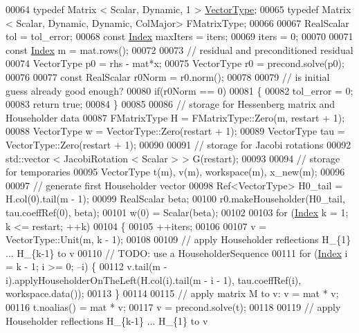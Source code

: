 \begin{DoxyCode}
00064   \textcolor{keyword}{typedef} Matrix < Scalar, Dynamic, 1 > \hyperlink{struct_vector_type}{VectorType};
00065   \textcolor{keyword}{typedef} Matrix < Scalar, Dynamic, Dynamic, ColMajor> FMatrixType;
00066 
00067   RealScalar tol = tol\_error;
00068   \textcolor{keyword}{const} \hyperlink{namespace_eigen_a62e77e0933482dafde8fe197d9a2cfde}{Index} maxIters = iters;
00069   iters = 0;
00070 
00071   \textcolor{keyword}{const} \hyperlink{namespace_eigen_a62e77e0933482dafde8fe197d9a2cfde}{Index} m = mat.rows();
00072 
00073   \textcolor{comment}{// residual and preconditioned residual}
00074   VectorType p0 = rhs - mat*x;
00075   VectorType r0 = precond.solve(p0);
00076 
00077   \textcolor{keyword}{const} RealScalar r0Norm = r0.norm();
00078 
00079   \textcolor{comment}{// is initial guess already good enough?}
00080   \textcolor{keywordflow}{if}(r0Norm == 0)
00081   \{
00082     tol\_error = 0;
00083     \textcolor{keywordflow}{return} \textcolor{keyword}{true};
00084   \}
00085 
00086   \textcolor{comment}{// storage for Hessenberg matrix and Householder data}
00087   FMatrixType H   = FMatrixType::Zero(m, restart + 1);
00088   VectorType w    = VectorType::Zero(restart + 1);
00089   VectorType tau  = VectorType::Zero(restart + 1);
00090 
00091   \textcolor{comment}{// storage for Jacobi rotations}
00092   std::vector < JacobiRotation < Scalar > > G(restart);
00093   
00094   \textcolor{comment}{// storage for temporaries}
00095   VectorType t(m), v(m), workspace(m), x\_new(m);
00096 
00097   \textcolor{comment}{// generate first Householder vector}
00098   Ref<VectorType> H0\_tail = H.col(0).tail(m - 1);
00099   RealScalar beta;
00100   r0.makeHouseholder(H0\_tail, tau.coeffRef(0), beta);
00101   w(0) = Scalar(beta);
00102   
00103   \textcolor{keywordflow}{for} (\hyperlink{namespace_eigen_a62e77e0933482dafde8fe197d9a2cfde}{Index} k = 1; k <= restart; ++k)
00104   \{
00105     ++iters;
00106 
00107     v = VectorType::Unit(m, k - 1);
00108 
00109     \textcolor{comment}{// apply Householder reflections H\_\{1\} ... H\_\{k-1\} to v}
00110     \textcolor{comment}{// TODO: use a HouseholderSequence}
00111     \textcolor{keywordflow}{for} (\hyperlink{namespace_eigen_a62e77e0933482dafde8fe197d9a2cfde}{Index} i = k - 1; i >= 0; --i) \{
00112       v.tail(m - i).applyHouseholderOnTheLeft(H.col(i).tail(m - i - 1), tau.coeffRef(i), workspace.data());
00113     \}
00114 
00115     \textcolor{comment}{// apply matrix M to v:  v = mat * v;}
00116     t.noalias() = mat * v;
00117     v = precond.solve(t);
00118 
00119     \textcolor{comment}{// apply Householder reflections H\_\{k-1\} ... H\_\{1\} to v}

\end{DoxyCode}
